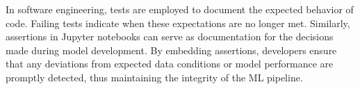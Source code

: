In software engineering, tests are employed to document the expected behavior of code. Failing tests indicate when these expectations are no longer met. Similarly, assertions in Jupyter notebooks can serve as documentation for the decisions made during model development. By embedding assertions, developers ensure that any deviations from expected data conditions or model performance are promptly detected, thus maintaining the integrity of the ML pipeline.








